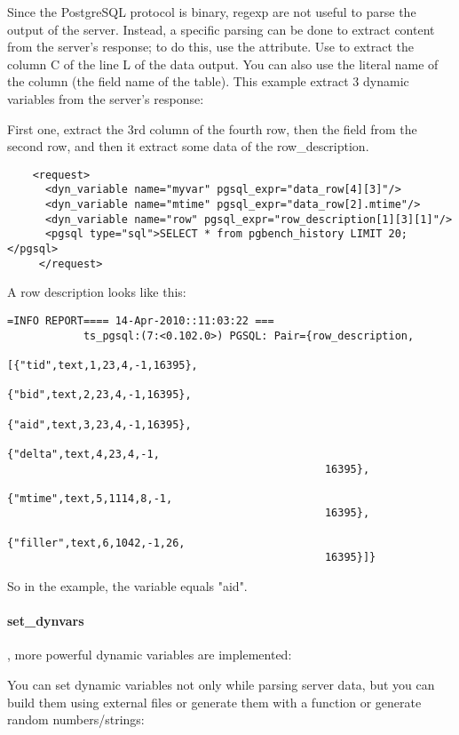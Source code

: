 \documentclass{TSUNG-en}
\begin{document}
Since the  PostgreSQL protocol is binary, regexp are not useful to
parse the output of the server. Instead, a specific parsing can be
done to extract content from the server's response; to do this, use the
 attribute. Use  to
extract the  column C of the  line L of the data output. You can also use
the literal name of the column (\ie the field name of the
table). This example extract 3 dynamic variables from the server's
response:

First one, extract the 3rd column of the fourth row, then the 
field from the second row, and then it extract some data of the
row\_description.

\begin{Verbatim}
    <request>
      <dyn_variable name="myvar" pgsql_expr="data_row[4][3]"/>
      <dyn_variable name="mtime" pgsql_expr="data_row[2].mtime"/>
      <dyn_variable name="row" pgsql_expr="row_description[1][3][1]"/>
      <pgsql type="sql">SELECT * from pgbench_history LIMIT 20;</pgsql>
     </request>
\end{Verbatim}

A row description looks like this:
\begin{Verbatim}
=INFO REPORT==== 14-Apr-2010::11:03:22 ===
            ts_pgsql:(7:<0.102.0>) PGSQL: Pair={row_description,
                                                [{"tid",text,1,23,4,-1,16395},
                                                 {"bid",text,2,23,4,-1,16395},
                                                 {"aid",text,3,23,4,-1,16395},
                                                 {"delta",text,4,23,4,-1,
                                                  16395},
                                                 {"mtime",text,5,1114,8,-1,
                                                  16395},
                                                 {"filler",text,6,1042,-1,26,
                                                  16395}]}
\end{Verbatim}

So in the example, the  variable equals "aid".

\paragraph{set\_dynvars}

, more powerful dynamic variables are implemented:

You can set dynamic variables not only while parsing server data, but
you can build them using external files or generate them with a function
or generate random numbers/strings:
\end{document}
